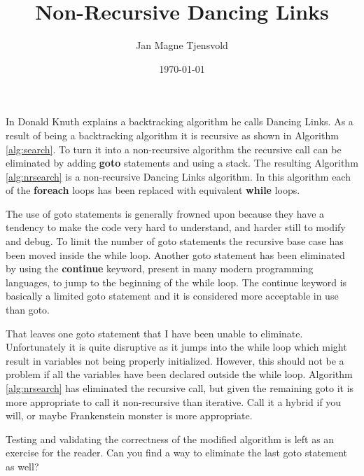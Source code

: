 \documentclass[a4paper]{article}
\title{Non-Recursive Dancing Links}
\author{Jan Magne Tjensvold}
\date{\today}
\begin{document}
\maketitle  %



In \cite{knuth00dancing} Donald Knuth explains a backtracking algorithm he calls Dancing Links.
As a result of being a backtracking algorithm it is recursive as shown in Algorithm \ref{alg:search}.
To turn it into a non-recursive algorithm the recursive call can be eliminated by adding \textbf{goto} statements and using a stack.
The resulting Algorithm \ref{alg:nrsearch} is a non-recursive Dancing Links algorithm.
In this algorithm each of the \textbf{foreach} loops has been replaced with equivalent \textbf{while} loops.

The use of goto statements is generally frowned upon because they have a tendency to make the code very hard to understand, and harder still to modify and debug.
To limit the number of goto statements the recursive base case has been moved inside the while loop.
Another goto statement has been eliminated by using the \textbf{continue} keyword, present in many modern programming languages, to jump to the beginning of the while loop.
The continue keyword is basically a limited goto statement and it is considered more acceptable in use than goto.

That leaves one goto statement that I have been unable to eliminate.
Unfortunately it is quite disruptive as it jumps into the while loop which might result in variables not being properly initialized.
However, this should not be a problem if all the variables have been declared outside the while loop.
Algorithm \ref{alg:nrsearch} has eliminated the recursive call, but given the remaining goto it is more appropriate to call it non-recursive than iterative.
Call it a hybrid if you will, or maybe Frankenstein monster is more appropriate.

Testing and validating the correctness of the modified algorithm is left as an exercise for the reader.
Can you find a way to eliminate the last goto statement as well?
\end{document}

